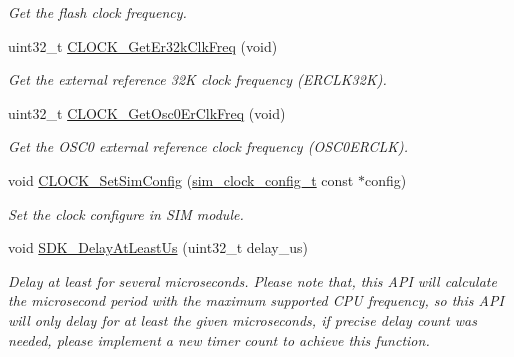\begin{DoxyCompactItemize}
\begin{DoxyCompactList}\small\item\em Get the flash clock frequency. \end{DoxyCompactList}\item 
uint32\+\_\+t \mbox{\hyperlink{group__clock_ga37466efe335f7268cee76c7d01fd52f5}{C\+L\+O\+C\+K\+\_\+\+Get\+Er32k\+Clk\+Freq}} (void)
\begin{DoxyCompactList}\small\item\em Get the external reference 32K clock frequency (E\+R\+C\+L\+K32K). \end{DoxyCompactList}\item 
uint32\+\_\+t \mbox{\hyperlink{group__clock_gaebc45953dc5ae83b02ced8a14e8857b9}{C\+L\+O\+C\+K\+\_\+\+Get\+Osc0\+Er\+Clk\+Freq}} (void)
\begin{DoxyCompactList}\small\item\em Get the O\+S\+C0 external reference clock frequency (O\+S\+C0\+E\+R\+C\+LK). \end{DoxyCompactList}\item 
void \mbox{\hyperlink{group__clock_gaf72980630bd050338cffd07f7d3b4944}{C\+L\+O\+C\+K\+\_\+\+Set\+Sim\+Config}} (\mbox{\hyperlink{group__clock_gad8383426c7f9ff4119a0b6c10de5281d}{sim\+\_\+clock\+\_\+config\+\_\+t}} const $\ast$config)
\begin{DoxyCompactList}\small\item\em Set the clock configure in S\+IM module. \end{DoxyCompactList}\item 
void \mbox{\hyperlink{group__clock_gaf9804be766685e8ffd3221461bf00d1b}{S\+D\+K\+\_\+\+Delay\+At\+Least\+Us}} (uint32\+\_\+t delay\+\_\+us)
\begin{DoxyCompactList}\small\item\em Delay at least for several microseconds. Please note that, this A\+PI will calculate the microsecond period with the maximum supported C\+PU frequency, so this A\+PI will only delay for at least the given microseconds, if precise delay count was needed, please implement a new timer count to achieve this function. \end{DoxyCompactList}\end{DoxyCompactItemize}
